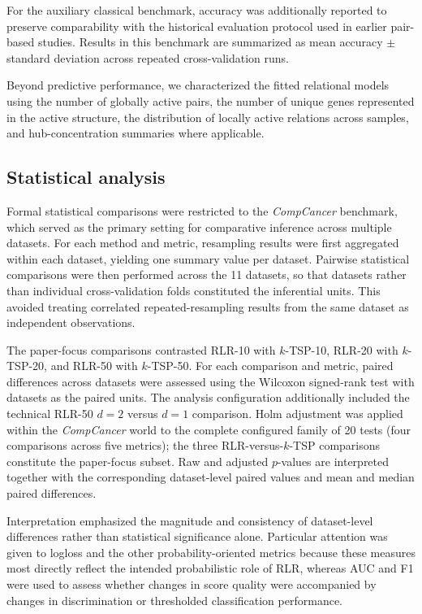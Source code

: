 \documentclass[journal]{IEEEtran}
\begin{document}
For the auxiliary classical benchmark, accuracy was additionally reported to preserve comparability with the historical evaluation protocol used in earlier pair-based studies. Results in this benchmark are summarized as mean accuracy $\pm$ standard deviation across repeated cross-validation runs.

Beyond predictive performance, we characterized the fitted relational models using the number of globally active pairs, the number of unique genes represented in the active structure, the distribution of locally active relations across samples, and hub-concentration summaries where applicable.

\subsection{Statistical analysis}

Formal statistical comparisons were restricted to the \emph{CompCancer} benchmark, which served as the primary setting for comparative inference across multiple datasets. For each method and metric, resampling results were first aggregated within each dataset, yielding one summary value per dataset. Pairwise statistical comparisons were then performed across the 11 datasets, so that datasets rather than individual cross-validation folds constituted the inferential units. This avoided treating correlated repeated-resampling results from the same dataset as independent observations.

The paper-focus comparisons contrasted RLR-10 with $k$-TSP-10, RLR-20 with $k$-TSP-20, and RLR-50 with $k$-TSP-50. For each comparison and metric, paired differences across datasets were assessed using the Wilcoxon signed-rank test \cite{Wilcoxon1945} with datasets as the paired units. The analysis configuration additionally included the technical RLR-50 $d=2$ versus $d=1$ comparison. Holm adjustment \cite{Holm1979} was applied within the \emph{CompCancer} world to the complete configured family of 20 tests (four comparisons across five metrics); the three RLR-versus-$k$-TSP comparisons constitute the paper-focus subset. Raw and adjusted $p$-values are interpreted together with the corresponding dataset-level paired values and mean and median paired differences.

Interpretation emphasized the magnitude and consistency of dataset-level differences rather than statistical significance alone. Particular attention was given to logloss and the other probability-oriented metrics because these measures most directly reflect the intended probabilistic role of RLR, whereas AUC and F1 were used to assess whether changes in score quality were accompanied by changes in discrimination or thresholded classification performance.
\end{document}
